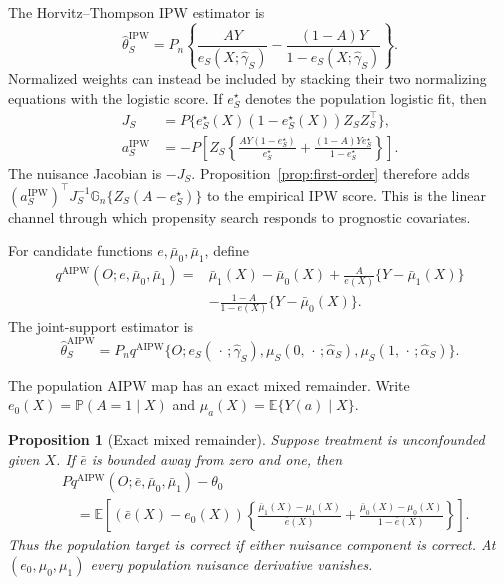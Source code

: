 \documentclass[a4paper,10pt,english]{article}
\newtheorem{proposition}{Proposition}[section]
\newcommand{\E}{\mathbb E}
\newcommand{\Prob}{\mathbb P}
\begin{document}
The Horvitz--Thompson IPW estimator is
\begin{equation}\label{eq:ipw-map}
 \hat\theta_S^{\mathrm{IPW}}
 =P_n\left\{
 \frac{AY}{e_S(X;\hat\gamma_S)}
 -\frac{(1-A)Y}{1-e_S(X;\hat\gamma_S)}\right\}.
\end{equation}
Normalized weights can instead be included by stacking their two
normalizing equations with the logistic score.  If $e_S^\star$ denotes the
population logistic fit, then
\begin{align}
 J_S&=P\{e_S^\star(X)(1-e_S^\star(X))Z_SZ_S^\top\},
 \label{eq:fisher-information}\\
 a_S^{\mathrm{IPW}}
 &=-P\left[Z_S\left\{
       \frac{AY(1-e_S^\star)}{e_S^\star}
       +\frac{(1-A)Ye_S^\star}{1-e_S^\star}
       \right\}\right].
 \label{eq:ipw-derivative}
\end{align}
The nuisance Jacobian is $-J_S$.  Proposition~\ref{prop:first-order}
therefore adds
$(a_S^{\mathrm{IPW}})^\top J_S^{-1}
\mathbb G_n\{Z_S(A-e_S^\star)\}$ to the empirical IPW score.  This is the
linear channel through which propensity search responds to prognostic
covariates.

For candidate functions $e,\bar\mu_0,\bar\mu_1$, define
\begin{equation}\label{eq:aipw-map}
\begin{split}
 q^{\mathrm{AIPW}}(O;e,\bar\mu_0,\bar\mu_1)
 ={}&\bar\mu_1(X)-\bar\mu_0(X)
 +\frac{A}{e(X)}\{Y-\bar\mu_1(X)\}\\
 &-\frac{1-A}{1-e(X)}\{Y-\bar\mu_0(X)\}.
\end{split}
\end{equation}
The joint-support estimator is
\begin{equation}\label{eq:in-sample-aipw}
 \hat\theta_S^{\mathrm{AIPW}}
 =P_nq^{\mathrm{AIPW}}
 \{O;e_S(\,\cdot\,;\hat\gamma_S),
       \mu_S(0,\,\cdot\,;\hat\alpha_S),
       \mu_S(1,\,\cdot\,;\hat\alpha_S)\}.
\end{equation}

The population AIPW map has an exact mixed remainder.  Write
$e_0(X)=\Prob(A=1\mid X)$ and
$\mu_a(X)=\E\{Y(a)\mid X\}$.

\begin{proposition}[Exact mixed remainder]
\label{prop:aipw-mixed-remainder}
Suppose treatment is unconfounded given $X$.  If $\bar e$ is bounded away
from zero and one, then
\begin{equation}\label{eq:aipw-bias-identity}
\begin{split}
 &Pq^{\mathrm{AIPW}}(O;\bar e,\bar\mu_0,\bar\mu_1)-\theta_0\\
 &\quad=\E\left[(\bar e(X)-e_0(X))
 \left\{
 \frac{\bar\mu_1(X)-\mu_1(X)}{\bar e(X)}
 +\frac{\bar\mu_0(X)-\mu_0(X)}{1-\bar e(X)}
 \right\}\right].
\end{split}
\end{equation}
Thus the population target is correct if either nuisance component is
correct.  At $(e_0,\mu_0,\mu_1)$ every population nuisance derivative
vanishes.
\end{proposition}
\end{document}
